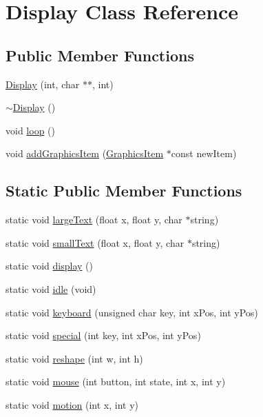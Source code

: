 \hypertarget{classDisplay}{}\section{Display Class Reference}
\label{classDisplay}
\subsection*{Public Member Functions}
\begin{DoxyCompactItemize}
\item 
\mbox{\hyperlink{classDisplay_a14f0b3465a13c09d9de5b5ed03ca824d}{Display}} (int, char $\ast$$\ast$, int)
\item 
\mbox{\hyperlink{classDisplay_ac2607a6bb236c55547a4223d40d85d1f}{$\sim$\+Display}} ()
\item 
void \mbox{\hyperlink{classDisplay_ab4010e1cfbab001623fb90460102e3ad}{loop}} ()
\item 
void \mbox{\hyperlink{classDisplay_a2374289dfe325db9f908499f7907528a}{add\+Graphics\+Item}} (\mbox{\hyperlink{classGraphicsItem}{Graphics\+Item}} $\ast$const new\+Item)
\end{DoxyCompactItemize}
\subsection*{Static Public Member Functions}
\begin{DoxyCompactItemize}
\item 
static void \mbox{\hyperlink{classDisplay_ae6e3bc9a8a261958251d1c3d6e6f791b}{large\+Text}} (float x, float y, char $\ast$string)
\item 
static void \mbox{\hyperlink{classDisplay_ac62e7e33c27d8c012c3efb8c07f3fc11}{small\+Text}} (float x, float y, char $\ast$string)
\item 
static void \mbox{\hyperlink{classDisplay_aa3ab70ec7b76fa3ed139d19e53e72283}{display}} ()
\item 
static void \mbox{\hyperlink{classDisplay_aee4bd8d62d2911a938523339630a4357}{idle}} (void)
\item 
static void \mbox{\hyperlink{classDisplay_a534c28d5e7287ad3e98106a6d8105e68}{keyboard}} (unsigned char key, int x\+Pos, int y\+Pos)
\item 
static void \mbox{\hyperlink{classDisplay_ad973a37817adac76ae9373dc4f5ba22b}{special}} (int key, int x\+Pos, int y\+Pos)
\item 
static void \mbox{\hyperlink{classDisplay_a655b5e6c69cae3a1b45388448e9064e4}{reshape}} (int w, int h)
\item 
static void \mbox{\hyperlink{classDisplay_a711fdd8ee2c30e8e54d2883ae3e1bbf8}{mouse}} (int button, int state, int x, int y)
\item 
static void \mbox{\hyperlink{classDisplay_a56b5e2138938b063f81e83ad9ed4dae3}{motion}} (int x, int y)
\end{DoxyCompactItemize}



